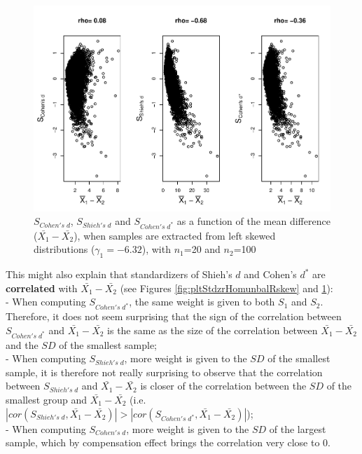 \documentclass[
  english,
  man,mask]{apa6}
\begin{document}
\begin{figure}
\centering
\includegraphics{Correlation_files/figure-latex/pltStdzrHomunbalLskew-1.pdf}
\caption{\label{fig:pltStdzrHomunbalLskew}\(S_{Cohen's \; d}\), \(S_{Shieh's \; d}\) and \(S_{Cohen's \; d^*}\) as a function of the mean difference (\(\bar{X_1}-\bar{X_2}\)), when samples are extracted from left skewed distributions (\(\gamma_1 = -6.32\)), with \(n_1\)=20 and \(n_2\)=100}
\end{figure}

This might also explain that standardizers of Shieh's \(d\) and Cohen's \(d^*\) are \textbf{correlated} with \(\bar{X_1}-\bar{X_2}\) (see Figures \ref{fig:pltStdzrHomunbalRskew} and \ref{fig:pltStdzrHomunbalLskew}):\\
- When computing \(S_{Cohen's \; d^*}\), the same weight is given to both \(S_1\) and \(S_2\). Therefore, it does not seem surprising that the sign of the correlation between \(S_{Cohen's \; d^*}\) and \(\bar{X_1}-\bar{X_2}\) is the same as the size of the correlation between \(\bar{X_1}-\bar{X_2}\) and the \(SD\) of the smallest sample;\\
- When computing \(S_{Shieh's \; d}\), more weight is given to the \(SD\) of the smallest sample, it is therefore not really surprising to observe that the correlation between \(S_{Shieh's \; d}\) and \(\bar{X_1}-\bar{X_2}\) is closer of the correlation between the \(SD\) of the smallest group and \(\bar{X_1}-\bar{X_2}\) (i.e.~\(|cor(S_{Shieh's \; d},\bar{X_1}-\bar{X_2})| > |cor(S_{Cohen's \; d^*},\bar{X_1}-\bar{X_2})|\));\\
- When computing \(S_{Cohen's \; d}\), more weight is given to the \(SD\) of the largest sample, which by compensation effect brings the correlation very close to 0.
\end{document}
